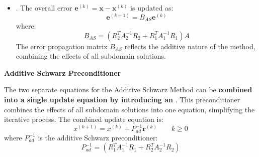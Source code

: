 \begin{itemize}
    \item {}. The overall error $\mathbf{e}^{(k)} = \mathbf{x} - \mathbf{x}^{(k)}$ is updated as:
    \begin{equation*}
        \mathbf{e}^{(k+1)} = B_{AS} \mathbf{e}^{(k)}
    \end{equation*}
    where:
    \begin{equation*}
        B_{AS} = (R_{2}^{T} A_{2}^{-1} R_{2} + R_{1}^{T} A_{1}^{-1} R_{1}) A
    \end{equation*}
    The error propagation matrix $B_{AS}$ reflects the additive nature of the method, combining the effects of all subdomain solutions.
\end{itemize}

\newpage

\begin{flushleft}
    \textcolor{Green3}{ \textbf{Additive Schwarz Preconditioner}}
\end{flushleft}
The two separate equations for the Additive Schwarz Method can be \textbf{combined into a single update equation by introducing an} . This preconditioner combines the effects of all subdomain solutions into one equation, simplifying the iterative process. The combined update equation is:
\begin{equation}
    x^{\left(k+1\right)} = x^{\left(k\right)} + P_{ad}^{-1}\mathbf{r}^{\left(k\right)} \hspace{2em} k \ge 0
\end{equation}
where $P_{ad}^{-1}$ is the additive Schwarz preconditioner:
\begin{equation}
    P_{ad}^{-1} = \left(
        R_{1}^{T}A_{1}^{-1}R_{1} +
        R_{2}^{T}A_{2}^{-1}R_{2}
    \right)
\end{equation}
